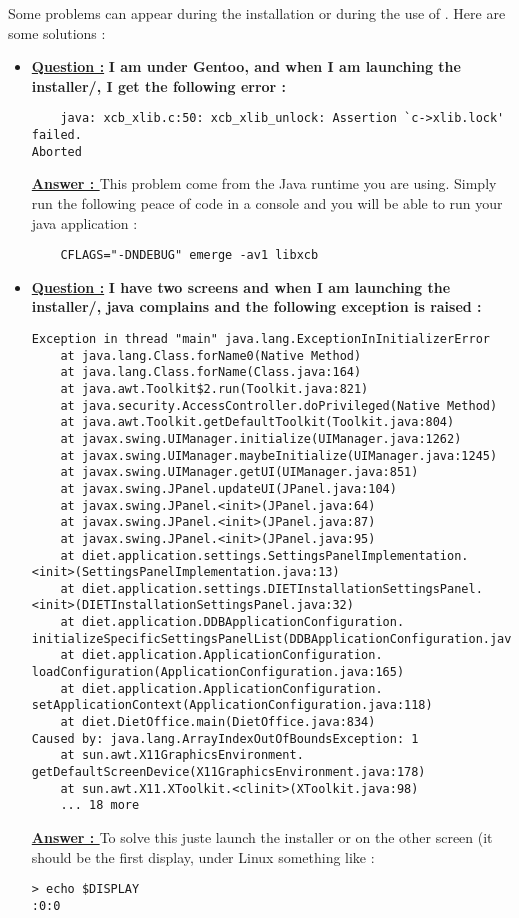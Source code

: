 Some problems can appear during the installation or during the use of \grudu.
Here are some solutions :
\begin{itemize}
  \item \textbf{\underline{Question :}} \textbf{I am under Gentoo, and when I am launching the
  installer/\grudu, I get the following error :}\\
  \begin{verbatim}
  	java: xcb_xlib.c:50: xcb_xlib_unlock: Assertion `c->xlib.lock' failed.
Aborted
  \end{verbatim}
	\textbf{\underline{Answer : }} This problem come from the Java runtime you are
	using. Simply run the following peace of code in a console and you will be able to run your java application :
	\begin{verbatim}
    CFLAGS="-DNDEBUG" emerge -av1 libxcb
    \end{verbatim}

  \item \textbf{\underline{Question :}} \textbf{I have two screens and when I
  am launching the installer/\grudu, java complains and the following
  exception is raised :}\\
  \begin{verbatim}
Exception in thread "main" java.lang.ExceptionInInitializerError
	at java.lang.Class.forName0(Native Method)
	at java.lang.Class.forName(Class.java:164)
	at java.awt.Toolkit$2.run(Toolkit.java:821)
	at java.security.AccessController.doPrivileged(Native Method)
	at java.awt.Toolkit.getDefaultToolkit(Toolkit.java:804)
	at javax.swing.UIManager.initialize(UIManager.java:1262)
	at javax.swing.UIManager.maybeInitialize(UIManager.java:1245)
	at javax.swing.UIManager.getUI(UIManager.java:851)
	at javax.swing.JPanel.updateUI(JPanel.java:104)
	at javax.swing.JPanel.<init>(JPanel.java:64)
	at javax.swing.JPanel.<init>(JPanel.java:87)
	at javax.swing.JPanel.<init>(JPanel.java:95)
	at diet.application.settings.SettingsPanelImplementation.
<init>(SettingsPanelImplementation.java:13)
	at diet.application.settings.DIETInstallationSettingsPanel.
<init>(DIETInstallationSettingsPanel.java:32)
	at diet.application.DDBApplicationConfiguration.
initializeSpecificSettingsPanelList(DDBApplicationConfiguration.java:49)
	at diet.application.ApplicationConfiguration.
loadConfiguration(ApplicationConfiguration.java:165)
	at diet.application.ApplicationConfiguration.
setApplicationContext(ApplicationConfiguration.java:118)
	at diet.DietOffice.main(DietOffice.java:834)
Caused by: java.lang.ArrayIndexOutOfBoundsException: 1
	at sun.awt.X11GraphicsEnvironment.
getDefaultScreenDevice(X11GraphicsEnvironment.java:178)
	at sun.awt.X11.XToolkit.<clinit>(XToolkit.java:98)
	... 18 more
	\end{verbatim}
\textbf{\underline{Answer : }} To solve this juste launch the installer or
\grudu on the other screen (it should be the first display, under Linux
something like :
\begin{verbatim}
> echo $DISPLAY
:0:0
\end{verbatim}
\end{itemize}
